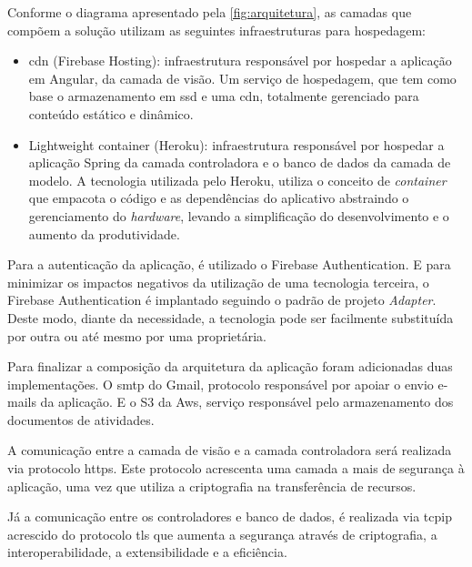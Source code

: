 Conforme o diagrama apresentado pela \autoref{fig:arquitetura}, as camadas que compõem a solução utilizam as seguintes infraestruturas para hospedagem:
\begin{itemize}
\item \ac{cdn} (Firebase Hosting): infraestrutura responsável por hospedar a aplicação em Angular, da camada de visão. Um serviço de hospedagem, que tem como base o armazenamento em \ac{ssd} e uma \ac{cdn}, totalmente gerenciado para conteúdo estático e dinâmico.
\item  Lightweight container (Heroku): infraestrutura responsável por hospedar a aplicação Spring da camada controladora e o banco de dados da camada de modelo. A tecnologia utilizada pelo Heroku, utiliza o conceito de \textit{\gls{container}} que empacota o código e as dependências do aplicativo abstraindo o gerenciamento do \textit{\gls{hardware}}, levando a simplificação do desenvolvimento e o aumento da produtividade.
\end{itemize}

Para a autenticação da aplicação, é utilizado o Firebase Authentication. E para minimizar os impactos negativos da utilização de uma tecnologia terceira, o Firebase Authentication é implantado seguindo o padrão de projeto \textit{Adapter}. Deste modo, diante da necessidade, a tecnologia pode ser facilmente substituída por outra ou até mesmo por uma proprietária.

Para finalizar a composição da arquitetura da aplicação foram adicionadas duas implementações. O \ac{smtp} do Gmail, protocolo responsável por apoiar o envio e-mails da aplicação. E o S3 da Aws, serviço responsável pelo armazenamento dos documentos de atividades.


A comunicação entre a camada de visão e a camada controladora será realizada via protocolo \ac{https}. Este protocolo acrescenta uma camada a mais de segurança à aplicação, uma vez que utiliza a criptografia na transferência de recursos.


Já a comunicação entre os controladores e banco de dados, é realizada via \ac{tcpip} acrescido do protocolo \ac{tls} que aumenta a segurança através de criptografia, a interoperabilidade, a extensibilidade e a eficiência.


